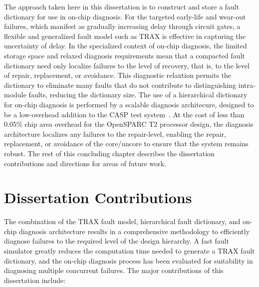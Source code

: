 The approach taken here in this dissertation is to construct and store a fault dictionary for use in on-chip diagnosis.
%
For the targeted early-life and wear-out failures, which manifest as gradually increasing delay through circuit gates, a flexible and generalized fault model such as TRAX is effective in capturing the uncertainty of delay.
%
In the specialized context of on-chip diagnosis, the limited storage space and relaxed diagnosis requirements mean that a compacted fault dictionary need only localize failures to the level of recovery, that is, to the level of repair, replacement, or avoidance.
%
This diagnostic relaxtion permits the dictionary to eliminate many faults that do not contribute to distinguishing intra-module faults, reducing the dictionary size.
%
The use of a hierarchical dictionary for on-chip diagnosis is performed by a scalable diagnosis architecure, designed to be a low-overhead addition to the CASP test system~\cite{li08}.
%
At the cost of less than 0.05\% chip area overhead for the OpenSPARC T2 processor design, the diagnosis architecture localizes any failures to the repair-level, enabling the repair, replacement, or avoidance of the core/uncore to ensure that the system remains robust.
%
The rest of this concluding chapter describes the dissertation contributions and directions for areas of future work.


\section{Dissertation Contributions}
\label{sec:conclusions_dissertation_contrib}

The combination of the TRAX fault model, hierarchical fault dictionary, and on-chip diagnosis architecture results in a comprehensive methodology to efficiently diagnose failures to the required level of the design hierarchy.
%
A fast fault simulator greatly reduces the computation time needed to generate a TRAX fault dictionary, and the on-chip diagnosis process has been evaluated for suitability in diagnosing multiple concurrent failures.
%
The major contributions of this dissertation include:

